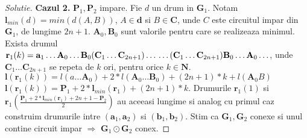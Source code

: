 \documentclass[12pt]{article}
\newenvironment{problema}[2][Problema]{\begin{trivlist}
\item[\hskip \labelsep {\bfseries #1}\hskip \labelsep {\bfseries #2.}]}{\end{trivlist}}
\begin{document}
\begin{proof}[Solutie]
\textbf{Cazul 2.} \(\mathbf{P}_{1}, \mathbf{P}_{2}\) impare. Fie \(d\) un drum in \(\mathbf{G}_{1}\). Notam \(\mathbf{l}_{min}(d) = \textit{min}(d(A,B))\), \(A\in{\textbf{d}}\) si \(B\in{\textbf{C}}\), unde \(C\) este circuitul impar din \(\mathbf{G}_{1}\), de lungime \(2n+1\). \(\mathbf{A}_{0}, \mathbf{B}_{0}\) sunt valorile pentru care se realizeaza minimul. Exista drumul \(\mathbf{r}_{1}(k)=\mathbf{a}_{1}\ldots\mathbf{A}_{0} \ldots\mathbf{B}_{0}(\mathbf{C}_{1}\ldots \mathbf{C}_{2n+1})\ldots\\\ldots(\mathbf{C}_{1}\ldots \mathbf{C}_{2n+1})\mathbf{B}_{0}\ldots\mathbf{A}_{0}\ldots\), unde \(\mathbf{C}_{1}\ldots \mathbf{C}_{2n+1}\) se repeta de \(k\) ori, pentru orice \(k\in{\textbf{N}}\). \\
\(\mathbf{l}(\mathbf{r}_{1}(k))=l(a\ldots\mathbf{A}_{0})+2*l( \mathbf{A}_{0}\ldots\mathbf{B}_{0})+(2n+1)*k+l(\mathbf{A}_{0}B)\)\\
\(\mathbf{l}(\mathbf{r}_{1}(k))=\mathbf{P}_{1}+2*\mathbf{l}_{min}(\mathbf{r}_{1})+(2n+1)*k\). Drumurile \(\mathbf{r}_{1}(1)\) si \(\mathbf{r}_{1}(\frac{\mathbf{P}_{1}+2*\mathbf{l}_{min}(\mathbf{r}_{1})+2n+1-\mathbf{P}_{2}}{2})\) au aceeasi lungime si analog cu primul caz construim drumurile intre \((\mathbf{a}_{1}, \mathbf{a}_{2})\) si \((\mathbf{b}_{1}, \mathbf{b}_{2})\). Stim ca \(\mathbf{G}_{1}, \mathbf{G}_{2}\) conexe si unul contine circuit impar \(\Rightarrow\) \(\mathbf{G}_{1}\odot{\mathbf{G}_{2}}\) conex.

\end{proof}

\newpage

\begin{problema}{3}
\end{problema}
 
\end{document}
